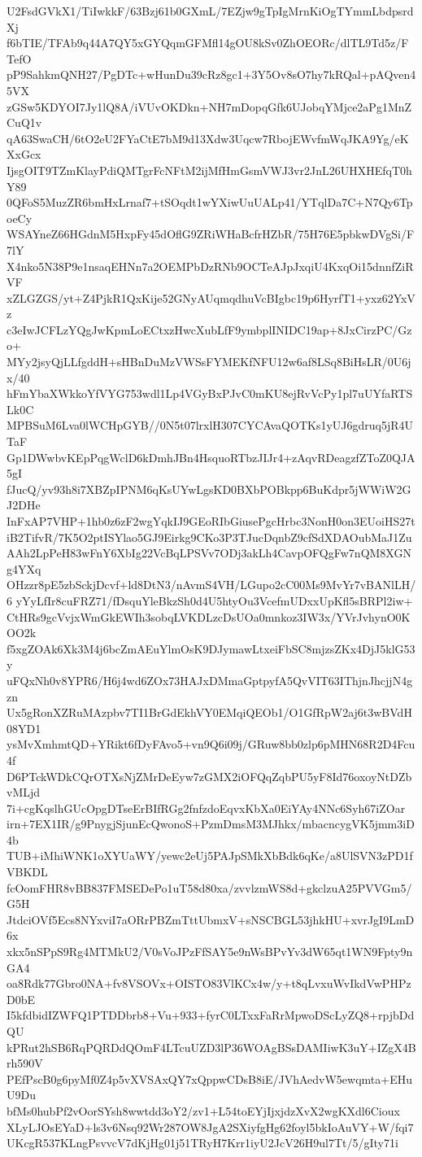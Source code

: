 U2FsdGVkX1/TiIwkkF/63Bzj61b0GXmL/7EZjw9gTpIgMrnKiOgTYmmLbdpsrdXj
f6bTIE/TFAb9q44A7QY5xGYQqmGFMfl14gOU8kSv0ZhOEORc/dlTL9Td5z/FTefO
pP9SahkmQNH27/PgDTc+wHunDu39cRz8gc1+3Y5Ov8sO7hy7kRQal+pAQven45VX
zGSw5KDYOI7Jy1lQ8A/iVUvOKDkn+NH7mDopqGfk6UJobqYMjce2aPg1MnZCuQ1v
qA63SwaCH/6tO2eU2FYaCtE7bM9d13Xdw3Uqcw7RbojEWvfmWqJKA9Yg/eKXxGcx
IjsgOIT9TZmKlayPdiQMTgrFcNFtM2ijMfHmGsmVWJ3vr2JnL26UHXHEfqT0hY89
0QFoS5MuzZR6bmHxLrnaf7+tSOqdt1wYXiwUuUALp41/YTqlDa7C+N7Qy6TpoeCy
WSAYneZ66HGdnM5HxpFy45dOflG9ZRiWHaBcfrHZbR/75H76E5pbkwDVgSi/F7lY
X4nko5N38P9e1nsaqEHNn7a2OEMPbDzRNb9OCTeAJpJxqiU4KxqOi15dnnfZiRVF
xZLGZGS/yt+Z4PjkR1QxKije52GNyAUqmqdhuVcBIgbc19p6HyrfT1+yxz62YxVz
c3eIwJCFLzYQgJwKpmLoECtxzHwcXubLfF9ymbplINIDC19ap+8JxCirzPC/Gzo+
MYy2jsyQjLLfgddH+sHBnDuMzVWSsFYMEKfNFU12w6af8LSq8BiHsLR/0U6jx/40
hFmYbaXWkkoYfVYG753wdl1Lp4VGyBxPJvC0mKU8ejRvVcPy1pl7uUYfaRTSLk0C
MPBSuM6Lva0lWCHpGYB//0N5t07lrxlH307CYCAvaQOTKs1yUJ6gdruq5jR4UTaF
Gp1DWwbvKEpPqgWclD6kDmhJBn4HsquoRTbzJIJr4+zAqvRDeagzfZToZ0QJA5gI
fJucQ/yv93h8i7XBZpIPNM6qKsUYwLgsKD0BXbPOBkpp6BuKdpr5jWWiW2GJ2DHe
InFxAP7VHP+1hb0z6zF2wgYqkIJ9GEoRIbGiusePgcHrbc3NonH0on3EUoiHS27t
iB2TifvR/7K5O2ptISYlao5GJ9Eirkg9CKo3P3TJucDqnbZ9cfSdXDAOubMaJ1Zu
AAh2LpPeH83wFnY6XbIg22VcBqLPSVv7ODj3akLh4CavpOFQgFw7nQM8XGNg4YXq
OHzzr8pE5zbSckjDcvf+ld8DtN3/nAvmS4VH/LGupo2cC00Ms9MvYr7vBANlLH/6
yYyLfIr8cuFRZ71/fDsquYleBkzSh0d4U5htyOu3VcefmUDxxUpKfl5sBRPl2iw+
CtHRs9gcVvjxWmGkEWIh3sobqLVKDLzcDsUOa0mnkoz3IW3x/YVrJvhynO0KOO2k
f5xgZOAk6Xk3M4j6bcZmAEuYlmOsK9DJymawLtxeiFbSC8mjzsZKx4DjJ5klG53y
uFQxNh0v8YPR6/H6j4wd6ZOx73HAJxDMmaGptpyfA5QvVIT63IThjnJhcjjN4gzn
Ux5gRonXZRuMAzpbv7TI1BrGdEkhVY0EMqiQEOb1/O1GfRpW2aj6t3wBVdH08YD1
ysMvXmhmtQD+YRikt6fDyFAvo5+vn9Q6i09j/GRuw8bb0zlp6pMHN68R2D4Fcu4f
D6PTckWDkCQrOTXsNjZMrDeEyw7zGMX2iOFQqZqbPU5yF8Id76oxoyNtDZbvMLjd
7i+cgKqslhGUcOpgDTseErBIfRGg2fnfzdoEqvxKbXa0EiYAy4NNc6Syh67iZOar
irn+7EX1IR/g9PnygjSjunEcQwonoS+PzmDmsM3MJhkx/mbacncygVK5jmm3iD4b
TUB+iMhiWNK1oXYUaWY/yewc2eUj5PAJpSMkXbBdk6qKe/a8UlSVN3zPD1fVBKDL
fcOomFHR8vBB837FMSEDePo1uT58d80xa/zvvlzmWS8d+gkclzuA25PVVGm5/G5H
JtdciOVf5Ecs8NYxviI7aORrPBZmTttUbmxV+sNSCBGL53jhkHU+xvrJgI9LmD6x
xkx5nSPpS9Rg4MTMkU2/V0sVoJPzFfSAY5e9nWsBPvYv3dW65qt1WN9Fpty9nGA4
oa8Rdk77Gbro0NA+fv8VSOVx+OISTO83VlKCx4w/y+t8qLvxuWvIkdVwPHPzD0bE
I5kfdbidIZWFQ1PTDDbrb8+Vu+933+fyrC0LTxxFaRrMpwoDScLyZQ8+rpjbDdQU
kPRut2hSB6RqPQRDdQOmF4LTcuUZD3lP36WOAgBSsDAMIiwK3uY+IZgX4Brh590V
PEfPscB0g6pyMf0Z4p5vXVSAxQY7xQppwCDsB8iE/JVhAedvW5ewqmta+EHuU9Du
bfMs0hubPf2vOorSYsh8wwtdd3oY2/zv1+L54toEYjIjxjdzXvX2wgKXdl6Cioux
XLyLJOsEYaD+ls3v6Nsq92Wr287OW8JgA2SXiyfgHg62foyl5bkIoAuVY+W/fqi7
UKcgR537KLngPsvvcV7dKjHg01j51TRyH7Krr1iyU2JcV26H9ul7Tt/5/gIty71i
